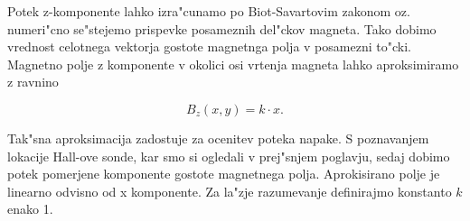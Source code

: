 Potek z-komponente lahko izra"cunamo po Biot-Savartovim zakonom oz. numeri"cno se"stejemo prispevke posameznih del"ckov magneta. Tako dobimo vrednost celotnega vektorja gostote magnetnga polja v posamezni to"cki. Magnetno polje z komponente v okolici osi vrtenja magneta lahko aproksimiramo z ravnino

\begin{equation}
\label{equ:poljeB}
B_z(x,y)=k\cdot x.
\end{equation}

Tak"sna aproksimacija zadostuje za ocenitev poteka napake. S poznavanjem lokacije Hall-ove sonde, kar smo si ogledali v prej"snjem poglavju, sedaj dobimo potek pomerjene komponente gostote magnetnega polja. Aprokisirano polje je linearno odvisno od x komponente. Za la"zje razumevanje definirajmo konstanto $k$ enako 1.


